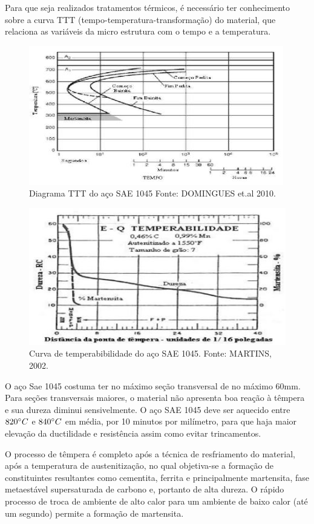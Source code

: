 Para que seja realizados tratamentos térmicos, é necessário ter conhecimento sobre a curva TTT (tempo-temperatura-transformação) do material, que relaciona as variáveis da micro estrutura com o tempo e a temperatura.
\begin{figure}[!ht]
	\centering
	\label{diagramattt}
	\includegraphics[keepaspectratio=true,scale=0.8]{figuras/diagramattt.JPG}
	\caption{Diagrama TTT do aço SAE 1045 Fonte: DOMINGUES et.al 2010.}
\end{figure}

\begin{figure}[!ht]
	\centering
	\label{curva_temperatura}
	\includegraphics[keepaspectratio=true,scale=0.8]{figuras/curva_temperatura.JPG}
	\caption{Curva de temperabibilidade do aço SAE 1045. Fonte: MARTINS, 2002.}
\end{figure}

O aço Sae 1045 costuma ter no máximo seção transversal de no máximo 60mm. Para seções transversais maiores, o material não apresenta boa reação à têmpera e sua dureza diminui sensivelmente. O aço SAE 1045 deve ser aquecido entre $820 \degree C$ e $840 \degree C$ em média, por 10 minutos por milímetro, para que haja maior elevação da ductilidade e resistência assim como evitar trincamentos.

O processo de têmpera é completo após a técnica de resfriamento do material, após a temperatura de austenitização, no qual objetiva-se a formação de constituintes resultantes como cementita, ferrita e principalmente martensita, fase metaestável supersaturada de carbono e, portanto de alta dureza. O rápido processo de troca de ambiente de alto calor para um ambiente de baixo calor (até um segundo) permite a formação de martensita.

